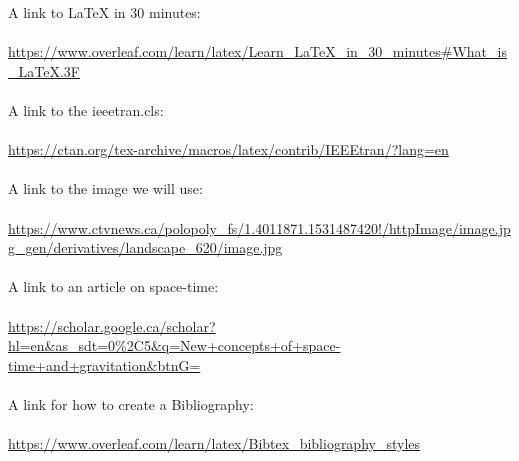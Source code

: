 \documentclass{article} %
\begin{document}
A link to LaTeX in 30 minutes:\\\\
\url{https://www.overleaf.com/learn/latex/Learn_LaTeX_in_30_minutes#What_is_LaTeX.3F}\\\\

A link to the ieeetran.cls:\\\\
\url{https://ctan.org/tex-archive/macros/latex/contrib/IEEEtran/?lang=en}\\\\

A link to the image we will use:\\\\
\url{https://www.ctvnews.ca/polopoly_fs/1.4011871.1531487420!/httpImage/image.jpg_gen/derivatives/landscape_620/image.jpg}\\\\

A link to an article on space-time:\\\\
\url{https://scholar.google.ca/scholar?hl=en&as_sdt=0%2C5&q=New+concepts+of+space-time+and+gravitation&btnG=}\\\\

A link for how to create a Bibliography:\\\\
\url{https://www.overleaf.com/learn/latex/Bibtex_bibliography_styles}\\\\
\end{document}

